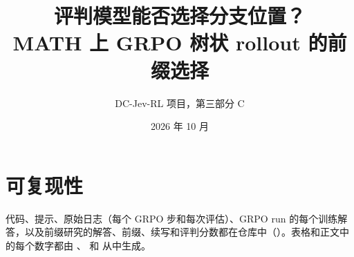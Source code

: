 \documentclass[11pt]{ctexart}
\title{评判模型能否选择分支位置？\\MATH 上 GRPO 树状 rollout 的前缀选择}
\author{DC-Jev-RL 项目，第三部分 C}
\date{2026 年 10 月}
\begin{document}
\maketitle

\begin{abstract}

\end{abstract}







\section*{可复现性}
代码、提示、原始日志（每个 GRPO 步和每次评估）、GRPO run 的每个训练解答，以及前缀研究的解答、前缀、续写和评判分数都在仓库中（）。表格和正文中的每个数字都由 、 和  从中生成。



\end{document}
